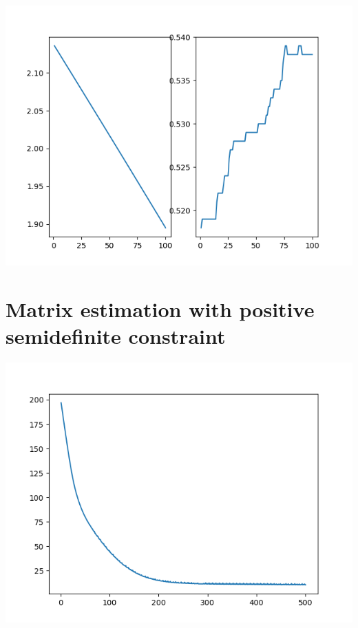 \documentclass{article}
\begin{document}
\includegraphics{1-2.png}
	
\section{Matrix estimation with positive semidefinite constraint}



\includegraphics{2-1.png}
\end{document}
